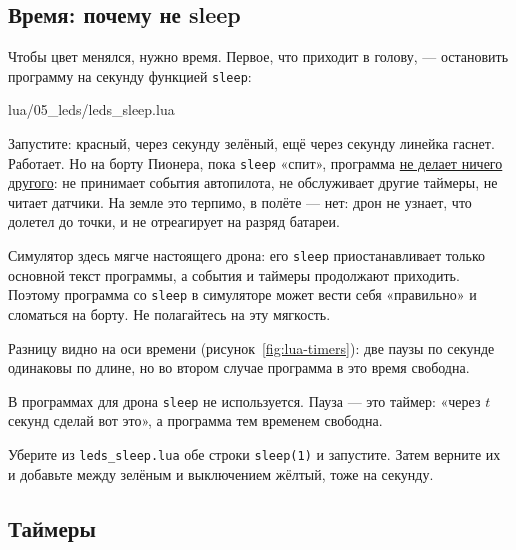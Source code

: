 \subsection{Время: почему не sleep}

Чтобы цвет менялся, нужно время. Первое, что приходит в голову, --- остановить программу на секунду функцией \verb|sleep|:

\begin{codefile}{lua/05_leds/leds_sleep.lua}
\end{codefile}

Запустите: красный, через секунду зелёный, ещё через секунду линейка гаснет. Работает. Но на борту Пионера, пока \verb|sleep| «спит», программа \hyperlink{term:blocking}{не делает ничего другого}: не принимает события автопилота, не обслуживает другие таймеры, не читает датчики. На земле это терпимо, в полёте --- нет: дрон не узнает, что долетел до точки, и не отреагирует на разряд батареи.

Симулятор здесь мягче настоящего дрона: его \verb|sleep| приостанавливает только основной текст программы, а события и таймеры продолжают приходить. Поэтому программа со \verb|sleep| в симуляторе может вести себя «правильно» и сломаться на борту. Не полагайтесь на эту мягкость.

Разницу видно на оси времени (рисунок~\ref{fig:lua-timers}): две паузы по секунде одинаковы по длине, но во втором случае программа в это время свободна.



\begin{rulebox}
В программах для дрона \verb|sleep| не используется. Пауза --- это таймер: «через $t$ секунд сделай вот это», а программа тем временем свободна.
\end{rulebox}

\begin{taskbox}
Уберите из \texttt{leds\_sleep.lua} обе строки \verb|sleep(1)| и запустите. Затем верните их и добавьте между зелёным и выключением жёлтый, тоже на секунду.
\end{taskbox}

\subsection{Таймеры}

